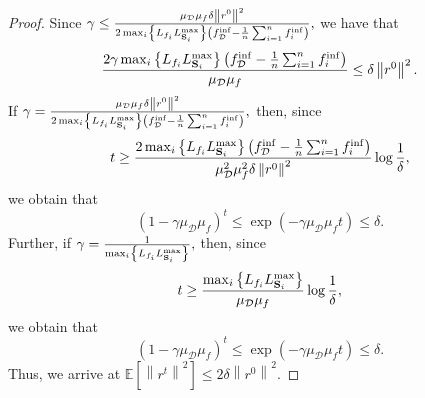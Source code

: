 \documentclass{article}
\newcommand{\bb}{\mathbb}
\newcommand{\Exp}[1]{{\bb E}\left[#1\right]}
\theoremstyle{plain}
\newcommand{\tf}{f_{\mathcal{D}}}
\newcommand{\mS}{{\bf S}}
\theoremstyle{plain}
\theoremstyle{definition}
\theoremstyle{remark}
\begin{document}
\begin{proof}
	Since $\gamma\leq\frac{\mu_{\mathcal{D}}\mu_f\delta\left\|r^0\right\|^2}{2\max_i\left\lbrace L_{f_i}L_{\mS_i}^{\max} \right\rbrace \left(\tf^{\inf} - \frac{1}{n}\sum_{i=1}^{n}f_i^{\inf}\right)},$
	we have that
	\begin{equation*}
		\frac{2\gamma\max_i\left\lbrace L_{f_i}L_{\mS_i}^{\max} \right\rbrace \left(\tf^{\inf} - \frac{1}{n}\sum_{i=1}^{n}f_i^{\inf}\right)}{\mu_{\mathcal{D}}\mu_f} \leq\delta\left\|r^0\right\|^2.
	\end{equation*}
	If $\gamma=\frac{\mu_{\mathcal{D}}\mu_f\delta\left\|r^0\right\|^2}{2\max_i\left\lbrace L_{f_i}L_{\mS_i}^{\max} \right\rbrace \left(\tf^{\inf} - \frac{1}{n}\sum_{i=1}^{n}f_i^{\inf}\right)},$ then, since
	\begin{equation*}
		t\geq \frac{2\max_i\left\lbrace L_{f_i}L_{\mS_i}^{\max} \right\rbrace \left(\tf^{\inf} - \frac{1}{n}\sum_{i=1}^{n}f_i^{\inf}\right)}{\mu_{\mathcal{D}}^2\mu_f^2\delta\left\|r^0\right\|^2}\log\frac{1}{\delta},
	\end{equation*}
	we obtain that
	\begin{equation*}
		\left(1-\gamma\mu_{\mathcal{D}}\mu_f\right)^t\leq\exp\left(-\gamma\mu_{\mathcal{D}}\mu_ft\right)\leq\delta.
	\end{equation*}
	Further, if $\gamma=\frac{1}{\max_i\left\lbrace L_{f_i}L_{\mS_i}^{\max} \right\rbrace},$ then, since
	\begin{equation*}
		t\geq \frac{\max_i\left\lbrace L_{f_i}L_{\mS_i}^{\max} \right\rbrace}{\mu_{\mathcal{D}}\mu_f}\log\frac{1}{\delta},
	\end{equation*}
	we obtain that
	\begin{equation*}
		\left(1-\gamma\mu_{\mathcal{D}}\mu_f\right)^t\leq\exp\left(-\gamma\mu_{\mathcal{D}}\mu_ft\right)\leq\delta.
	\end{equation*}
	Thus, we arrive at $\Exp{\left\|r^{t}\right\|^2} \leq 2\delta\left\|r^0\right\|^2.$
\end{proof}
\end{document}
